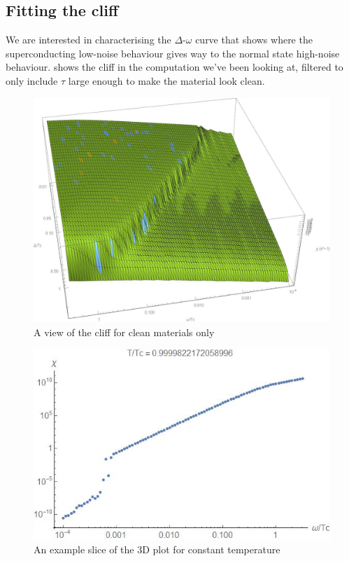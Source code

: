 \documentclass[%
 preprint,
 amsmath,amssymb,
 aps,
]{revtex4-2}
\begin{document}
\subsection{Fitting the cliff}

We are interested in characterising the $\Delta$-$\omega$ curve that shows where the superconducting low-noise behaviour gives way to the normal state high-noise behaviour.
 shows the cliff in the computation we've been looking at, filtered to only include $\tau$ large enough to make the material look clean.

\begin{figure}[htp]
	\centering
	\includegraphics[width=\linewidth]{sharpcliffview}
	\caption{A view of the cliff for clean materials only} \label{fig:cliffview}
\end{figure}

\begin{figure}[htp]
	\centering
	\includegraphics[width=\linewidth]{exampleconsttplot}
	\caption{An example slice of the 3D plot for constant temperature} \label{fig:exConstTPlot}
\end{figure}
\end{document}
